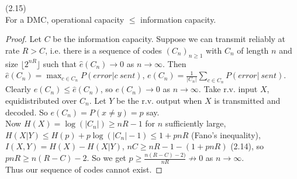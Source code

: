 \documentclass[a4paper]{article}
\begin{document}
\begin{prop} (2.15)\\
For a DMC, operational capacity $\leq$ information capacity.
\begin{proof}
Let $C$ be the information capacity. Suppose we can transmit reliably at rate $R>C$, i.e. there is a sequence of codes $(C_n)_{n \geq 1}$ with $C_n$ of length $n$ and size $\lfloor 2^{nR} \rfloor$ such that $\hat{e}(C_n) \to 0$ as $n \to \infty$. Then $\hat{e}(C_n) = \max_{c \in C_n} P(error | c\ sent)$, $e(C_n) = \frac{1}{|C_n|} \sum_{c \in C_n} P(error|\ sent)$. Clearly $e(C_n) \leq \hat{e}(C_n)$, so $e(C_n) \to 0$ as $n \to \infty$. Take r.v. input $X$, equidistributed over $C_n$. Let $Y$ be the r.v. output when $X$ is transmitted and decoded. So $e(C_n) = P(x \neq y) = p$ say.\\
Now $H(X) = \log (|C_n|) \geq nR-1$ for $n$ sufficiently large, $H(X|Y) \leq H(p) + p\log (|C_n|-1) \leq 1+pnR$ (Fano's inequality), $I(X,Y) = H(X) - H(X|Y)$, $nC \geq nR-1 - (1+pnR)$ (2.14), so $pnR \geq n(R-C)-2$. So we get $p \geq \frac{n(R-C)-2)}{nR} \not\to 0$ as $n \to \infty$.\\
Thus our sequence of codes cannot exist.
\end{proof}
\end{prop}
\end{document}
